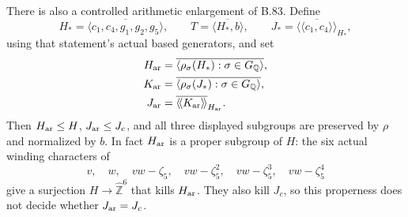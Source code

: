 There is also a controlled arithmetic enlargement of B.83. Define
\[
 H_* =\overline{\langle c_1,c_4,g_1,g_2,g_5\rangle},\qquad
 T=\overline{\langle H_*,b\rangle},\qquad
 J_*=\overline{\langle\!\langle c_1,c_4\rangle\!\rangle}_{H_*},
\]
using that statement's actual based generators, and set
\[
\begin{split}
 H_{\rm ar}&=\overline{\langle \rho_\sigma(H_*):
                              \sigma\in G_{\mathbb Q}\rangle},\\
 K_{\rm ar}&=\overline{\langle \rho_\sigma(J_*):
                              \sigma\in G_{\mathbb Q}\rangle},\\
 J_{\rm ar}&=\overline{\langle\!\langle K_{\rm ar}
                              \rangle\!\rangle}_{H_{\rm ar}}.
\end{split}
\]
Then $H_{\rm ar}\leq H$, $J_{\rm ar}\leq J_c$, and all three displayed
subgroups are preserved by $\rho$ and normalized by $b$. In fact
$H_{\rm ar}$ is a proper subgroup of $H$: the six actual winding
characters of
\[
 v,\quad w,\quad vw-\zeta_5,\quad vw-\zeta_5^2,\quad
 vw-\zeta_5^3,\quad vw-\zeta_5^4
\]
give a surjection $H\to\widehat{\mathbb Z}^{6}$ that kills
$H_{\rm ar}$. They also kill $J_c$, so this properness does not decide
whether $J_{\rm ar}=J_c$.

